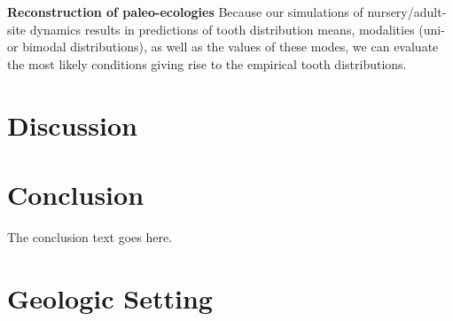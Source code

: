 \documentclass[]{rsos}%
\begin{document}



\textbf{Reconstruction of paleo-ecologies}
Because our simulations of nursery/adult-site dynamics results in predictions of tooth distribution means, modalities (uni- or bimodal distributions), as well as the values of these modes, we can evaluate the most likely conditions giving rise to the empirical tooth distributions.


\section{Discussion}






\section{Conclusion}
The conclusion text goes here.

\vskip1pc









\pagebreak

\section{Geologic Setting}
\end{document}
